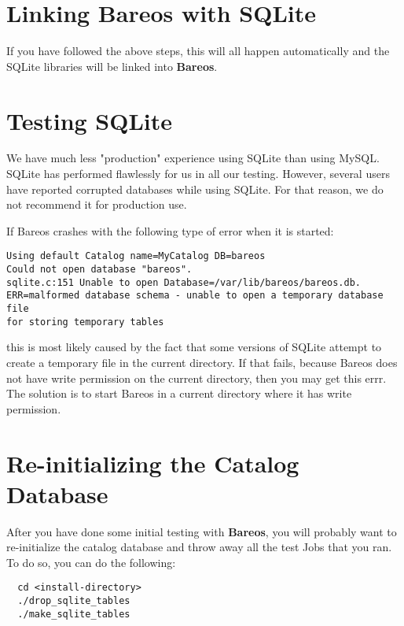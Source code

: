 \section{Linking Bareos with SQLite}

If you have followed the above steps, this will all happen automatically and
the SQLite libraries will be linked into {\bf Bareos}.

\section{Testing SQLite}

We have much less "production" experience using SQLite than using MySQL.
SQLite has performed flawlessly for us in all our testing.  However,
several users have reported corrupted databases while using SQLite.  For
that reason, we do not recommend it for production use.

If Bareos crashes with the following type of error when it is started:
\footnotesize
\begin{verbatim}
Using default Catalog name=MyCatalog DB=bareos
Could not open database "bareos".
sqlite.c:151 Unable to open Database=/var/lib/bareos/bareos.db.
ERR=malformed database schema - unable to open a temporary database file
for storing temporary tables
\end{verbatim}
\normalsize

this is most likely caused by the fact that some versions of
SQLite attempt to create a temporary file in the current directory.
If that fails, because Bareos does not have write permission on
the current directory, then you may get this errr.  The solution is
to start Bareos in a current directory where it has write permission.


\section{Re-initializing the Catalog Database}

After you have done some initial testing with {\bf Bareos}, you will probably
want to re-initialize the catalog database and throw away all the test Jobs
that you ran. To do so, you can do the following:

\footnotesize
\begin{verbatim}
  cd <install-directory>
  ./drop_sqlite_tables
  ./make_sqlite_tables
\end{verbatim}
\normalsize


